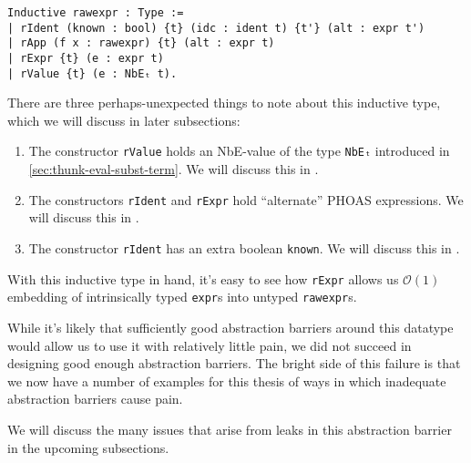 \begin{verbatim}
Inductive rawexpr : Type :=
| rIdent (known : bool) {t} (idc : ident t) {t'} (alt : expr t')
| rApp (f x : rawexpr) {t} (alt : expr t)
| rExpr {t} (e : expr t)
| rValue {t} (e : NbEₜ t).
\end{verbatim}
\label{sec:rewriting-more:rawexpr-def}%
There are three perhaps-unexpected things to note about this inductive type, which we will discuss in later subsections:
\begin{enumerate}
\item
  The constructor \texttt{rValue} holds an NbE-value of the type \texttt{NbEₜ} introduced in \autoref{sec:thunk-eval-subst-term}.
  We will discuss this in .
\item
  The constructors \texttt{rIdent} and \texttt{rExpr} hold ``alternate'' PHOAS expressions.
  We will discuss this in .
\item
  The constructor \texttt{rIdent} has an extra boolean \texttt{known}.
  We will discuss this in .
\end{enumerate}

With this inductive type in hand, it's easy to see how \texttt{rExpr} allows us $\mathcal{O}(1)$ embedding of intrinsically typed \texttt{expr}s into untyped \texttt{rawexpr}s.

While it's likely that sufficiently good abstraction barriers around this datatype would allow us to use it with relatively little pain, we did not succeed in designing good enough abstraction barriers.
The bright side of this failure is that we now have a number of examples for this thesis of ways in which inadequate abstraction barriers cause pain.

We will discuss the many issues that arise from leaks in this abstraction barrier in the upcoming subsections.


